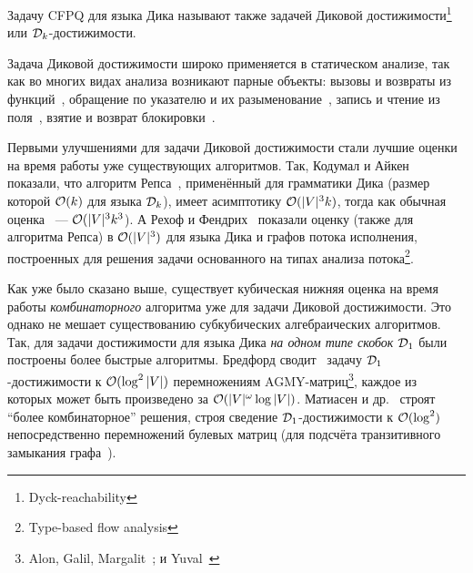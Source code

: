 \begin{definition}\label{def:dyck_reach}
  Задачу CFPQ для языка Дика называют также задачей Диковой достижимости\footnote{Dyck-reachability}~\cite{Kodumal04} или $\mathcal{D}_k$-достижимости.
\end{definition}

Задача Диковой достижимости широко применяется в статическом анализе, так как во многих видах анализа возникают парные объекты: вызовы и возвраты из функций~\cite{Tang15}, обращение по указателю и их разыменование~\cite{Zheng08}, запись и чтение из поля~\cite{Yan11}, взятие и возврат блокировки~\cite{Kahlon09}.



Первыми улучшениями для задачи Диковой достижимости стали лучшие оценки на время работы уже существующих алгоритмов. Так, Кодумал и Айкен~\cite{Kodumal04} показали, что алгоритм Репса~\cite{Reps97}, применённый для грамматики Дика (размер которой $\mathcal{O}(k)$ для языка $\mathcal{D}_k$), имеет асимптотику $\mathcal{O}(|V|^3 k)$, тогда как обычная оценка ~--- $\mathcal{O}(|V|^3 k^3$). А Рехоф и Фендрих~\cite{Rehof01} показали оценку (также для алгоритма Репса) в $\mathcal{O}(|V|^3)$ для языка Дика и графов потока исполнения, построенных для решения задачи основанного на типах анализа потока\footnote{Type-based flow analysis}.

Как уже было сказано выше, существует кубическая нижняя оценка на время работы \textit{комбинаторного} алгоритма уже для задачи Диковой достижимости. Это однако не мешает существованию субкубических алгебраических алгоритмов. Так, для задачи достижимости для языка Дика \textit{на одном типе скобок} $\mathcal{D}_1$ были построены более быстрые алгоритмы. Бредфорд сводит~\cite{Bradford17} задачу $\mathcal{D}_1$-достижимости к $\mathcal{O}(\log^2 |V|)$ перемножениям AGMY-матриц\footnote{Alon, Galil, Margalit~\cite{Alon1997}; и Yuval~\cite{Yuval1976}}, каждое из которых может быть произведено за $\mathcal{O}(|V|^{\omega} \log |V|)$. Матиасен и др.~\cite{Mathiasen21} строят ``более комбинаторное'' решения, строя сведение $\mathcal{D}_1$-достижимости к $\mathcal{O}(\log^2)$ непосредственно перемножений булевых матриц (для подсчёта транзитивного замыкания графа~\cite{Aho1974}).

